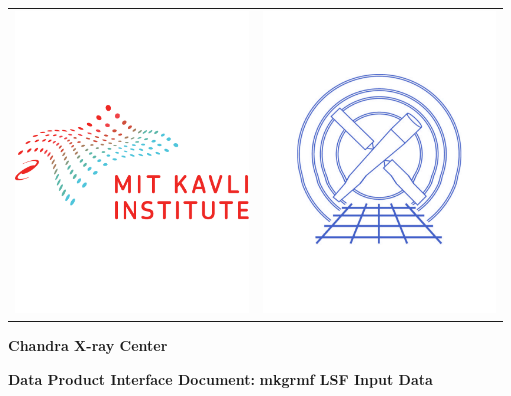 \documentclass[twoside]{article}
\begin{document}

\begin{titlepage}

  \begin{tabular}{p{}>{\raggedleft}p{}}
    \includegraphics[height=8cm]{Kavli_Logo} & \includegraphics[height=8cm]{cxc-logo}
  \end{tabular}

  \begin{center}
    \vspace*{.5in}
    {\Huge\bf Chandra X-ray Center}

    \vspace*{1in}

    {\LARGE\bf Data Product Interface Document:}
    \vspace*{.2in}
    {\LARGE\bf mkgrmf LSF Input Data}

    \vspace*{.2in}


\end{center}
\end{titlepage}
\end{document}
